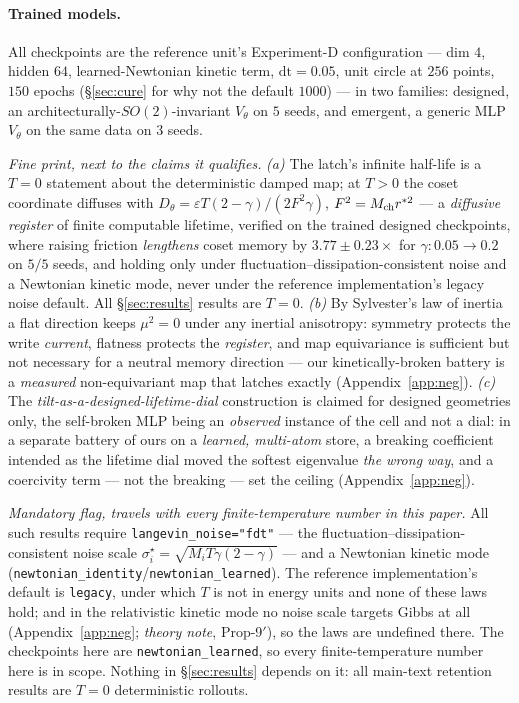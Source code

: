 \documentclass{article}
\begin{document}
\paragraph{Trained models.} All checkpoints are the reference unit's Experiment-D configuration --- dim $4$, hidden $64$, learned-Newtonian kinetic term, $\mathrm{dt}=0.05$, unit circle at $256$ points, $150$ epochs (\S\ref{sec:cure} for why not the default $1000$) --- in two families: designed, an architecturally-$SO(2)$-invariant $V_\theta$ on $5$ seeds, and emergent, a generic MLP $V_\theta$ on the same data on $3$ seeds.

{\footnotesize
\emph{Fine print, next to the claims it qualifies.} \emph{(a)} The latch's infinite half-life is a $T=0$ statement about the deterministic damped map; at $T>0$ the coset coordinate diffuses with $D_\theta=\varepsilon T(2-\gamma)/(2F^2\gamma)$, $F^2=M_{\rm ch}r^{*2}$ --- a \emph{diffusive register} of finite computable lifetime, verified on the trained designed checkpoints, where raising friction \emph{lengthens} coset memory by $3.77\pm0.23\times$ for $\gamma:0.05\to0.2$ on $5/5$ seeds, and holding only under fluctuation--dissipation-consistent noise and a Newtonian kinetic mode, never under the reference implementation's legacy noise default. All \S\ref{sec:results} results are $T=0$. \emph{(b)} By Sylvester's law of inertia a flat direction keeps $\mu^2=0$ under any inertial anisotropy: symmetry protects the write \emph{current}, flatness protects the \emph{register}, and map equivariance is sufficient but not necessary for a neutral memory direction --- our kinetically-broken battery is a \emph{measured} non-equivariant map that latches exactly (Appendix~\ref{app:neg}). \emph{(c)} The \emph{tilt-as-a-designed-lifetime-dial} construction is claimed for designed geometries only, the self-broken MLP being an \emph{observed} instance of the cell and not a dial: in a separate battery of ours on a \emph{learned, multi-atom} store, a breaking coefficient intended as the lifetime dial moved the softest eigenvalue \emph{the wrong way}, and a coercivity term --- not the breaking --- set the ceiling (Appendix~\ref{app:neg}).

\emph{Mandatory flag, travels with every finite-temperature number in this paper.} All such results require \texttt{langevin\_noise="fdt"} --- the fluctuation--dissipation-consistent noise scale $\sigma^\star_i=\sqrt{M_iT\gamma(2-\gamma)}$ --- and a Newtonian kinetic mode (\texttt{newtonian\_identity}/\texttt{newtonian\_learned}). The reference implementation's default is \texttt{legacy}, under which $T$ is not in energy units and none of these laws hold; and in the relativistic kinetic mode no noise scale targets Gibbs at all (Appendix~\ref{app:neg}; \emph{theory note}, Prop-9$'$), so the laws are undefined there. The checkpoints here are \texttt{newtonian\_learned}, so every finite-temperature number here is in scope. Nothing in \S\ref{sec:results} depends on it: all main-text retention results are $T=0$ deterministic rollouts.
\par}
\end{document}

